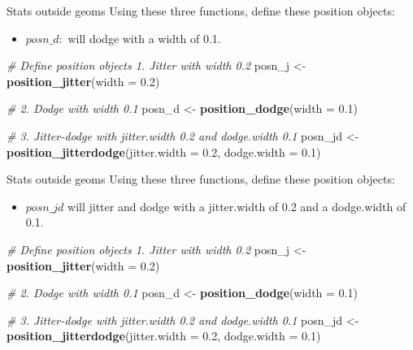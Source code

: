 \documentclass[
  ignorenonframetext,
]{beamer}
\newenvironment{Shaded}{\begin{snugshade}}{\end{snugshade}}
\newcommand{\AttributeTok}[1]{\textcolor[rgb]{0.13,0.29,0.53}{#1}}
\newcommand{\CommentTok}[1]{\textcolor[rgb]{0.56,0.35,0.01}{\textit{#1}}}
\newcommand{\FloatTok}[1]{\textcolor[rgb]{0.00,0.00,0.81}{#1}}
\newcommand{\FunctionTok}[1]{\textcolor[rgb]{0.13,0.29,0.53}{\textbf{#1}}}
\newcommand{\NormalTok}[1]{#1}
\newcommand{\OtherTok}[1]{\textcolor[rgb]{0.56,0.35,0.01}{#1}}
\providecommand{\tightlist}{%
  \setlength{\itemsep}{0pt}\setlength{\parskip}{0pt}}
\begin{document}
\begin{frame}[fragile]{Stats outside geoms}
\label{stats-outside-geoms-4}
Using these three functions, define these position objects:

\begin{itemize}
\tightlist
\item
  \(posn\_d:\) will dodge with a width of 0.1.
\end{itemize}


\begin{Shaded}
\begin{Highlighting}[]
\CommentTok{\# Define position objects 1. Jitter with width 0.2}
\NormalTok{posn\_j }\OtherTok{\textless{}{-}} \FunctionTok{position\_jitter}\NormalTok{(}\AttributeTok{width =} \FloatTok{0.2}\NormalTok{)}

\CommentTok{\# 2. Dodge with width 0.1}
\NormalTok{posn\_d }\OtherTok{\textless{}{-}} \FunctionTok{position\_dodge}\NormalTok{(}\AttributeTok{width =} \FloatTok{0.1}\NormalTok{)}

\CommentTok{\# 3. Jitter{-}dodge with jitter.width 0.2 and dodge.width 0.1}
\NormalTok{posn\_jd }\OtherTok{\textless{}{-}} \FunctionTok{position\_jitterdodge}\NormalTok{(}\AttributeTok{jitter.width =} \FloatTok{0.2}\NormalTok{, }\AttributeTok{dodge.width =} \FloatTok{0.1}\NormalTok{)}
\end{Highlighting}
\end{Shaded}
\end{frame}

\begin{frame}[fragile]{Stats outside geoms}
\label{stats-outside-geoms-5}
Using these three functions, define these position objects:

\begin{itemize}
\tightlist
\item
  \(posn\_jd\) will jitter and dodge with a jitter.width of 0.2 and a
  dodge.width of 0.1.
\end{itemize}


\begin{Shaded}
\begin{Highlighting}[]
\CommentTok{\# Define position objects 1. Jitter with width 0.2}
\NormalTok{posn\_j }\OtherTok{\textless{}{-}} \FunctionTok{position\_jitter}\NormalTok{(}\AttributeTok{width =} \FloatTok{0.2}\NormalTok{)}

\CommentTok{\# 2. Dodge with width 0.1}
\NormalTok{posn\_d }\OtherTok{\textless{}{-}} \FunctionTok{position\_dodge}\NormalTok{(}\AttributeTok{width =} \FloatTok{0.1}\NormalTok{)}

\CommentTok{\# 3. Jitter{-}dodge with jitter.width 0.2 and dodge.width 0.1}
\NormalTok{posn\_jd }\OtherTok{\textless{}{-}} \FunctionTok{position\_jitterdodge}\NormalTok{(}\AttributeTok{jitter.width =} \FloatTok{0.2}\NormalTok{, }\AttributeTok{dodge.width =} \FloatTok{0.1}\NormalTok{)}
\end{Highlighting}
\end{Shaded}
\end{frame}
\end{document}
